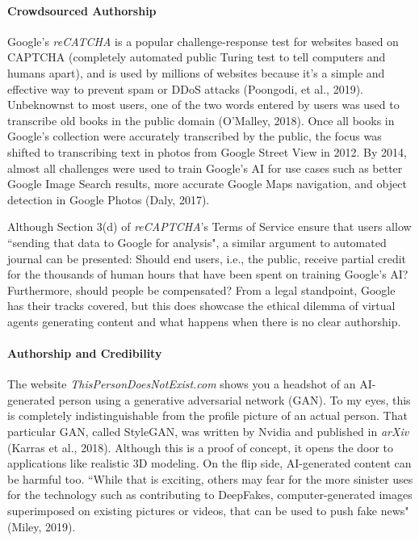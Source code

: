 \documentclass{article}
\begin{document}
\paragraph{Crowdsourced Authorship}

Google's \emph{reCATCHA} is a popular challenge-response test for websites based on CAPTCHA (completely automated public Turing test to tell computers and humans apart), and is used by millions of websites because it's a simple and effective way to prevent spam or DDoS attacks (Poongodi, et al., 2019). Unbeknownst to most users, one of the two words entered by users was used to transcribe old books in the public domain (O'Malley, 2018). Once all books in Google's collection were accurately transcribed by the public, the focus was shifted to transcribing text in photos from Google Street View in 2012. By 2014, almost all challenges were used to train Google's AI for use cases such as better Google Image Search results, more accurate Google Maps navigation, and object detection in Google Photos (Daly, 2017).

Although Section 3(d) of \emph{reCAPTCHA}'s Terms of Service ensure that users allow ``sending that data to Google for analysis", a similar argument to automated journal can be presented: Should end users, i.e., the public, receive partial credit for the thousands of human hours that have been spent on training Google's AI? Furthermore, should people be compensated? From a legal standpoint, Google has their tracks covered, but this does showcase the ethical dilemma of virtual agents generating content and what happens when there is no clear authorship.

\paragraph{Authorship and Credibility}

The website \emph{ThisPersonDoesNotExist.com} shows you a headshot of an AI-generated person using a generative adversarial network (GAN). To my eyes, this is completely indistinguishable from the profile picture of an actual person. That particular GAN, called StyleGAN, was written by Nvidia and published in \emph{arXiv} (Karras et al., 2018). Although this is a proof of concept, it opens the door to applications like realistic 3D modeling. On the flip side, AI-generated content can be harmful too. ``While that is exciting, others may fear for the more sinister uses for the technology such as contributing to DeepFakes, computer-generated images superimposed on existing pictures or videos, that can be used to push fake news" (Miley, 2019).
\end{document}
